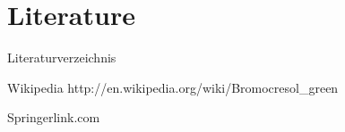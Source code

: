 \section{Literature}
\begin{frame}{Literaturverzeichnis}
	\begin{thebibliography}{10}
    
	\beamertemplateonlinebibitems
	Wikipedia
	\newblock {}
	\newblock http://en.wikipedia.org/wiki/Bromocresol\_green

	\beamertemplatearticlebibitems
	Springerlink.com
	\newblock {}
  \end{thebibliography}
\end{frame}

